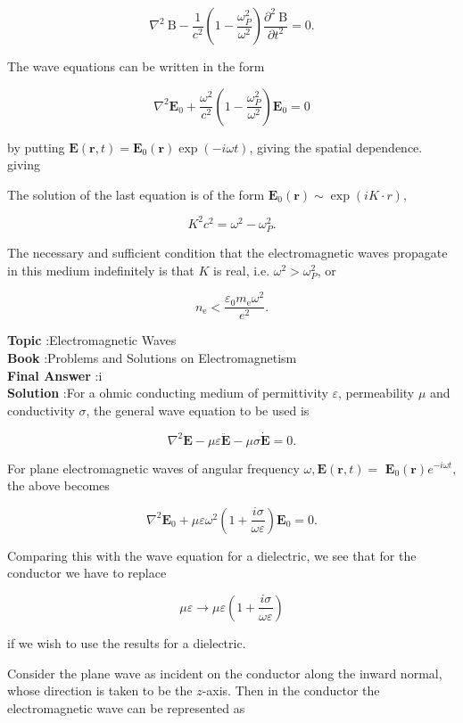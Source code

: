 \documentclass[10pt]{article}
\begin{document}
$$
\nabla^{2} \mathrm{~B}-\frac{1}{c^{2}}\left(1-\frac{\omega_{P}^{2}}{\omega^{2}}\right) \frac{\partial^{2} \mathrm{~B}}{\partial t^{2}}=0 .
$$

The wave equations can be written in the form

$$
\nabla^{2} \mathbf{E}_{0}+\frac{\omega^{2}}{c^{2}}\left(1-\frac{\omega_{P}^{2}}{\omega^{2}}\right) \mathbf{E}_{0}=0
$$

by putting $\mathbf{E}(\mathbf{r}, t)=\mathbf{E}_{0}(\mathbf{r}) \exp (-i \omega t)$, giving the spatial dependence. giving

 The solution of the last equation is of the form $\mathbf{E}_{0}(\mathbf{r}) \sim \exp (i K \cdot r)$,

$$
K^{2} c^{2}=\omega^{2}-\omega_{P}^{2} .
$$

The necessary and sufficient condition that the electromagnetic waves propagate in this medium indefinitely is that $K$ is real, i.e. $\omega^{2}>\omega_{P}^{2}$, or

$$
n_{\mathrm{e}}<\frac{\varepsilon_{0} m_{\mathrm{e}} \omega^{2}}{e^{2}} .
$$

\textbf{Topic} :Electromagnetic Waves\\
\textbf{Book} :Problems and Solutions on Electromagnetism\\
\textbf{Final Answer} :i \\


\textbf{Solution} :For a ohmic conducting medium of permittivity $\varepsilon$, permeability $\mu$ and conductivity $\sigma$, the general wave equation to be used is

$$
\nabla^{2} \mathbf{E}-\mu \varepsilon \ddot{\mathbf{E}}-\mu \sigma \dot{\mathbf{E}}=0 .
$$

For plane electromagnetic waves of angular frequency $\omega, \mathbf{E}(\mathbf{r}, t)=$ $\mathbf{E}_{0}(\mathbf{r}) e^{-i \omega t}$, the above becomes

$$
\nabla^{2} \mathbf{E}_{0}+\mu \varepsilon \omega^{2}\left(1+\frac{i \sigma}{\omega \varepsilon}\right) \mathbf{E}_{0}=0 .
$$

Comparing this with the wave equation for a dielectric, we see that for the conductor we have to replace

$$
\mu \varepsilon \rightarrow \mu \varepsilon\left(1+\frac{i \sigma}{\omega \varepsilon}\right)
$$

if we wish to use the results for a dielectric.

Consider the plane wave as incident on the conductor along the inward normal, whose direction is taken to be the $z$-axis. Then in the conductor the electromagnetic wave can be represented as
\end{document}
